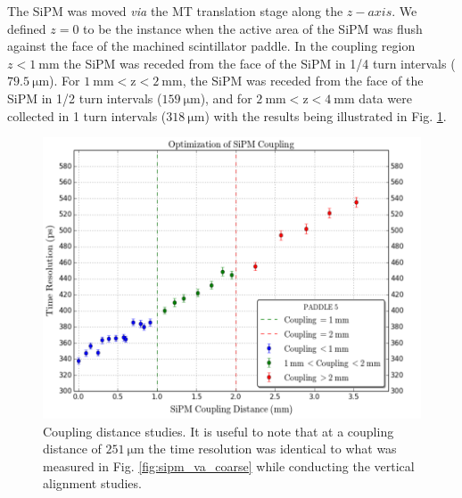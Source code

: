 The SiPM was moved \textit{via} the MT translation stage along the $z-axis$.  We defined $z = 0$ to be the instance when the active area of the SiPM was flush against the face of the machined scintillator paddle.  In the coupling region $z < 1\ \mathrm{mm}$ the SiPM was receded from the face of the SiPM in 1/4 turn intervals ($79.5\ \mathrm{\mu m}$).  For $\mathrm{1\ mm < z < 2\ mm}$, the SiPM was receded from the face of the SiPM in 1/2 turn intervals ($159\ \mathrm{\mu m}$), and for $\mathrm{2\ mm < z < 4\ mm}$ data were collected in 1 turn intervals ($\mathrm{318\ \mu m}$) with the results being illustrated in Fig. \ref{fig:sipm_coupling_coarse}.
	\begin{figure}[!htb]
		\centering
		\includegraphics[width=1.0\columnwidth]{misalignment/figs/sipm_coupling_coarse}
		\caption{Coupling distance studies.  It is useful to note that at a coupling distance of $\mathrm{251\ \mu m}$ the time resolution was identical to what was measured in Fig. \ref{fig:sipm_va_coarse} while conducting the vertical alignment studies.}
		\label{fig:sipm_coupling_coarse}
	\end{figure}

